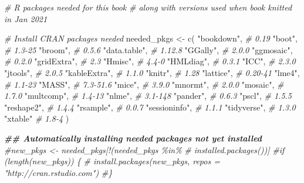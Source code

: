 \documentclass[
]{book}
\newenvironment{Shaded}{\begin{snugshade}}{\end{snugshade}}
\newcommand{\CommentTok}[1]{\textcolor[rgb]{0.37,0.37,0.37}{\textit{#1}}}
\newcommand{\DocumentationTok}[1]{\textcolor[rgb]{0.37,0.37,0.37}{\textbf{\textit{#1}}}}
\newcommand{\FunctionTok}[1]{\textcolor[rgb]{0,0,0}{#1}}
\newcommand{\NormalTok}[1]{#1}
\newcommand{\OtherTok}[1]{\textcolor[rgb]{0.37,0.37,0.37}{#1}}
\newcommand{\StringTok}[1]{\textcolor[rgb]{0.5,0.5,0.5}{#1}}
\theoremstyle{definition}
\theoremstyle{definition}
\theoremstyle{definition}
\theoremstyle{definition}
\theoremstyle{remark}
\begin{document}
\begin{Shaded}
\begin{Highlighting}[]
\CommentTok{\# R packages needed for this book}
\CommentTok{\#   along with versions used when book knitted in Jan 2021}

\CommentTok{\# Install CRAN packages needed}
\NormalTok{needed\_pkgs }\OtherTok{\textless{}{-}} \FunctionTok{c}\NormalTok{(}
  \StringTok{"bookdown"}\NormalTok{,     }\CommentTok{\# 0.19}
  \StringTok{"boot"}\NormalTok{,         }\CommentTok{\# 1.3{-}25}
  \StringTok{"broom"}\NormalTok{,        }\CommentTok{\# 0.5.6}
  \StringTok{"data.table"}\NormalTok{,   }\CommentTok{\# 1.12.8}
  \StringTok{"GGally"}\NormalTok{,       }\CommentTok{\# 2.0.0}
  \StringTok{"ggmosaic"}\NormalTok{,     }\CommentTok{\# 0.2.0}
  \StringTok{"gridExtra"}\NormalTok{,    }\CommentTok{\# 2.3}
  \StringTok{"Hmisc"}\NormalTok{,        }\CommentTok{\# 4.4{-}0}
  \StringTok{"HMLdiag"}\NormalTok{,      }\CommentTok{\# 0.3.1}
  \StringTok{"ICC"}\NormalTok{,          }\CommentTok{\# 2.3.0}
  \StringTok{"jtools"}\NormalTok{,       }\CommentTok{\# 2.0.5}
  \StringTok{"kableExtra"}\NormalTok{,   }\CommentTok{\# 1.1.0}
  \StringTok{"knitr"}\NormalTok{,        }\CommentTok{\# 1.28}
  \StringTok{"lattice"}\NormalTok{,      }\CommentTok{\# 0.20{-}41}
  \StringTok{"lme4"}\NormalTok{,         }\CommentTok{\# 1.1{-}23}
  \StringTok{"MASS"}\NormalTok{,         }\CommentTok{\# 7.3{-}51.6}
  \StringTok{"mice"}\NormalTok{,         }\CommentTok{\# 3.9.0}
  \StringTok{"mnormt"}\NormalTok{,       }\CommentTok{\# 2.0.0}
  \StringTok{"mosaic"}\NormalTok{,       }\CommentTok{\# 1.7.0}
  \StringTok{"multcomp"}\NormalTok{,     }\CommentTok{\# 1.4{-}13}
  \StringTok{"nlme"}\NormalTok{,         }\CommentTok{\# 3.1{-}148}
  \StringTok{"pander"}\NormalTok{,       }\CommentTok{\# 0.6.3}
  \StringTok{"pscl"}\NormalTok{,         }\CommentTok{\# 1.5.5}
  \StringTok{"reshape2"}\NormalTok{,     }\CommentTok{\# 1.4.4}
  \StringTok{"rsample"}\NormalTok{,      }\CommentTok{\# 0.0.7}
  \StringTok{"sessioninfo"}\NormalTok{,  }\CommentTok{\# 1.1.1}
  \StringTok{"tidyverse"}\NormalTok{,    }\CommentTok{\# 1.3.0}
  \StringTok{"xtable"}        \CommentTok{\# 1.8{-}4}
\NormalTok{)}

\DocumentationTok{\#\# Automatically installing needed packages not yet installed}
\CommentTok{\#new\_pkgs \textless{}{-} needed\_pkgs[!(needed\_pkgs \%in\%}
\CommentTok{\#  installed.packages())]}
\CommentTok{\#if (length(new\_pkgs)) \{}
\CommentTok{\#  install.packages(new\_pkgs, repos = "http://cran.rstudio.com")}
\CommentTok{\#\}}
\end{Highlighting}
\end{Shaded}
\end{document}
